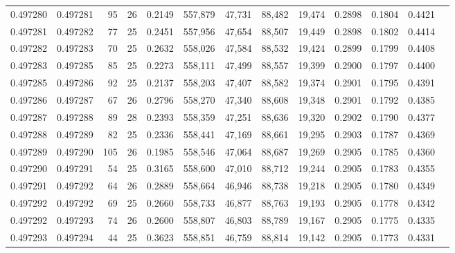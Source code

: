 \begin{tabular}{rrrrrrrrrrrrr}
0.497280 & 0.497281 &  95 &  26 &                                     0.2149 & 557,879 &  47,731 &  88,482 &  19,474 & 0.2898 & 0.1804 & 0.4421 \\
0.497281 & 0.497282 &  77 &  25 &                                     0.2451 & 557,956 &  47,654 &  88,507 &  19,449 & 0.2898 & 0.1802 & 0.4414 \\
0.497282 & 0.497283 &  70 &  25 &                                     0.2632 & 558,026 &  47,584 &  88,532 &  19,424 & 0.2899 & 0.1799 & 0.4408 \\
0.497283 & 0.497285 &  85 &  25 &                                     0.2273 & 558,111 &  47,499 &  88,557 &  19,399 & 0.2900 & 0.1797 & 0.4400 \\
0.497285 & 0.497286 &  92 &  25 &                                     0.2137 & 558,203 &  47,407 &  88,582 &  19,374 & 0.2901 & 0.1795 & 0.4391 \\
0.497286 & 0.497287 &  67 &  26 &                                     0.2796 & 558,270 &  47,340 &  88,608 &  19,348 & 0.2901 & 0.1792 & 0.4385 \\
0.497287 & 0.497288 &  89 &  28 &                                     0.2393 & 558,359 &  47,251 &  88,636 &  19,320 & 0.2902 & 0.1790 & 0.4377 \\
0.497288 & 0.497289 &  82 &  25 &                                     0.2336 & 558,441 &  47,169 &  88,661 &  19,295 & 0.2903 & 0.1787 & 0.4369 \\
0.497289 & 0.497290 & 105 &  26 &                                     0.1985 & 558,546 &  47,064 &  88,687 &  19,269 & 0.2905 & 0.1785 & 0.4360 \\
0.497290 & 0.497291 &  54 &  25 &                                     0.3165 & 558,600 &  47,010 &  88,712 &  19,244 & 0.2905 & 0.1783 & 0.4355 \\
0.497291 & 0.497292 &  64 &  26 &                                     0.2889 & 558,664 &  46,946 &  88,738 &  19,218 & 0.2905 & 0.1780 & 0.4349 \\
0.497292 & 0.497292 &  69 &  25 &                                     0.2660 & 558,733 &  46,877 &  88,763 &  19,193 & 0.2905 & 0.1778 & 0.4342 \\
0.497292 & 0.497293 &  74 &  26 &                                     0.2600 & 558,807 &  46,803 &  88,789 &  19,167 & 0.2905 & 0.1775 & 0.4335 \\
0.497293 & 0.497294 &  44 &  25 &                                     0.3623 & 558,851 &  46,759 &  88,814 &  19,142 & 0.2905 & 0.1773 & 0.4331 \\

\end{tabular}
